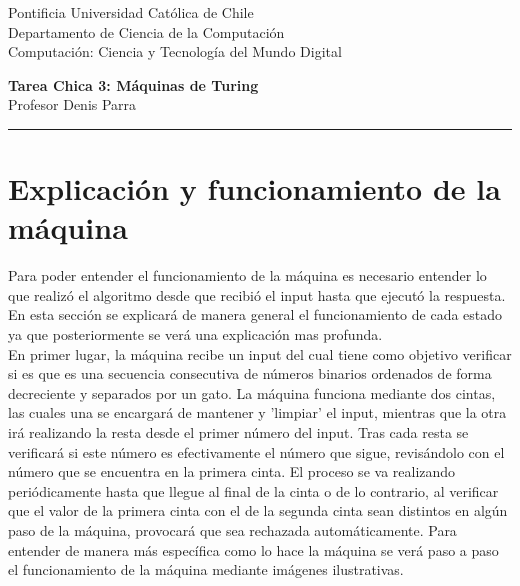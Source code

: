 \documentclass[12pt]{article}
\begin{document}
\begin{flushleft}
{\footnotesize Pontificia Universidad Católica de Chile\\
Departamento de Ciencia de la Computación\\
Computación: Ciencia y Tecnología del Mundo Digital\\
}
\begin{center}
{\huge\bf Tarea Chica 3: Máquinas de Turing}\\ \vspace{0.5cm}
Profesor Denis Parra \\

\rule{\linewidth}{0.1mm}
\end{center}
\end{flushleft}

\section*{Explicación y funcionamiento de la máquina }

Para poder entender el funcionamiento de la máquina es necesario entender lo que realizó el algoritmo desde que recibió el input hasta que ejecutó la respuesta. En esta sección se explicará de manera general el funcionamiento de cada estado ya que posteriormente se verá una explicación mas profunda. \\

En primer lugar, la máquina recibe un input del cual tiene como objetivo verificar si es que es una secuencia consecutiva de números binarios ordenados de forma decreciente y separados por un gato. La máquina funciona mediante dos cintas, las cuales una se encargará de mantener y 'limpiar' el input, mientras que la otra irá realizando la resta desde el primer número del input. Tras cada resta se verificará si este número es efectivamente el número que sigue, revisándolo con el número que se encuentra en la primera cinta. El proceso se va realizando periódicamente hasta que llegue al final de la cinta o de lo contrario, al verificar que el valor de la primera cinta con el de la segunda cinta sean distintos en algún paso de la máquina, provocará que sea rechazada automáticamente. Para entender de manera más específica como lo hace la máquina se verá paso a paso el funcionamiento de la máquina mediante imágenes ilustrativas. \\
\end{document}
